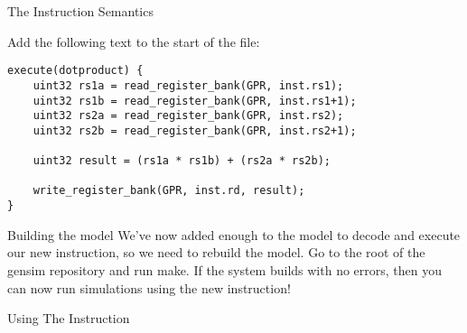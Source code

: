 \begin{frame}[fragile]{The Instruction Semantics}

Add the following text to the start of the file:

\begin{lstlisting}
execute(dotproduct) {
	uint32 rs1a = read_register_bank(GPR, inst.rs1);
	uint32 rs1b = read_register_bank(GPR, inst.rs1+1);
	uint32 rs2a = read_register_bank(GPR, inst.rs2);
	uint32 rs2b = read_register_bank(GPR, inst.rs2+1);
	
	uint32 result = (rs1a * rs1b) + (rs2a * rs2b);
	
	write_register_bank(GPR, inst.rd, result);
}
\end{lstlisting}

\end{frame}

\begin{frame}{Building the model}
We've now added enough to the model to decode and execute our new 
instruction, so we need to rebuild the model. Go to the root of the
gensim repository and run {\ttfamily make}. If the system builds with no errors,
then you can now run simulations using the new instruction!
\end{frame}

\begin{frame}{Using The Instruction}

\end{frame}
